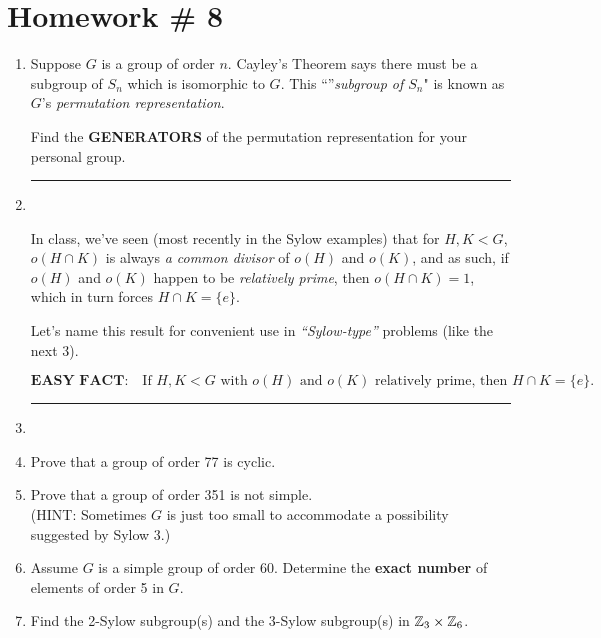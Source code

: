 \section*{Homework \# 8}
\label{sec:HW8}

\begin{enumerate}
    \item Suppose \( G \) is a group of order \( n \). Cayley’s Theorem says there must be a subgroup of \( S_n \) which is isomorphic to \( G \).  
    This ``''\textit{subgroup of \( S_n \)}" is known as \( G \)'s \textit{permutation representation}.  

    Find the \textbf{GENERATORS} of the permutation representation for your personal group.  \\ \steezybreak

    \item[] \rule{\textwidth}{0.4pt} \\ \steezybreak

    In class, we’ve seen (most recently in the Sylow examples) that for \( H, K < G \), \( o(H \cap K) \) is always \textit{a common divisor} of \( o(H) \) and \( o(K) \),  
    and as such, if \( o(H) \) and \( o(K) \) happen to be \textit{relatively prime}, then  
    \( o(H \cap K) = 1 \), which in turn forces \( H \cap K = \{e\} \).  \\ \steezybreak

    Let’s name this result for convenient use in  
    \textit{“Sylow-type”} problems (like the next 3).  

    \[
    \boxed{\textbf{EASY FACT:} \quad \text{If } H, K < G \text{ with } o(H) \text{ and } o(K) \text{ relatively prime, then } H \cap K = \{e\}.}
    \]

    \item[] \rule{\textwidth}{0.4pt} \\ \steezybreak

    \item Prove that a group of order 77 is cyclic.  \\ \steezybreak

    \item Prove that a group of order 351 is not simple.  \\
    (HINT: Sometimes \( G \) is just too small to accommodate a possibility suggested by Sylow \( 3 \).)  \\ \steezybreak

    \item Assume \( G \) is a simple group of order 60.  
    Determine the \textbf{exact number} of elements of order 5 in \( G \).  \\ \steezybreak

    \item Find the 2-Sylow subgroup(s) and the 3-Sylow subgroup(s) in \( {\mathbb{ Z}}_3 \times {\mathbb{ Z}}_6 \).  

\end{enumerate}
\newpage 

